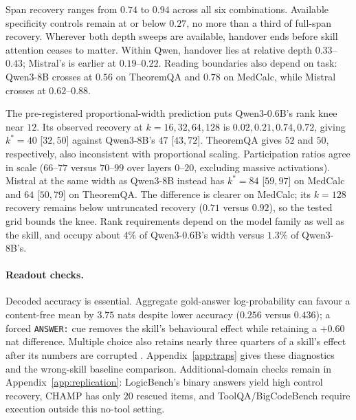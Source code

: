 \documentclass{article}
\begin{document}
\begin{table}[t]
\caption{Replication after the instrument fix. Injection layers are $8$ for
Qwen3-8B, $6$ for Qwen3-0.6B and $4$ for Mistral-7B. Recovery intervals bootstrap
skill groups. Max control is the largest available half-dose, other-skill,
permutation or noise result. Handover brackets the relative depth where
$\rho$ crosses below $0.5$; reading is the first knockout depth retaining at
least half of rescued items. $k^{*}$ is the grid-defined rank knee.
``--'' denotes a measurement not run after the fix.}
\label{tab:replication}
\centering
\footnotesize
\setlength{\tabcolsep}{4pt}

\end{table}

Span recovery ranges from $0.74$ to $0.94$ across all six combinations.
Available specificity controls remain at or below $0.27$, no more than a third
of full-span recovery. Wherever both depth sweeps are available, handover ends
before skill attention ceases to matter. Within Qwen, handover lies at relative
depth $0.33$--$0.43$; Mistral's is earlier at $0.19$--$0.22$. Reading boundaries
also depend on task: Qwen3-8B crosses at $0.56$ on TheoremQA and $0.78$ on
MedCalc, while Mistral crosses at $0.62$--$0.88$.

The pre-registered proportional-width prediction puts Qwen3-0.6B's rank knee
near $12$. Its observed recovery at $k=16,32,64,128$ is
$0.02,0.21,0.74,0.72$, giving $k^{*}=40$ [$32,50$] against Qwen3-8B's $47$
[$43,72$]. TheoremQA gives $52$ and $50$, respectively, also inconsistent with
proportional scaling. Participation ratios agree in scale ($66$--$77$ versus
$70$--$99$ over layers $0$--$20$, excluding massive activations). Mistral at the
same width as Qwen3-8B instead has $k^{*}=84$ [$59,97$] on MedCalc and $64$
[$50,79$] on TheoremQA. The difference is clearer on MedCalc; its $k=128$
recovery remains below untruncated recovery ($0.71$ versus $0.92$), so the tested
grid bounds the knee. Rank requirements depend on the model family as well as
the skill, and occupy about $4\%$ of Qwen3-0.6B's width versus $1.3\%$ of
Qwen3-8B's.

\paragraph{Readout checks.}
\label{sec:traps}
Decoded accuracy is essential. Aggregate gold-answer log-probability can favour
a content-free mean by $3.75$ nats despite lower accuracy ($0.256$ versus
$0.436$); a forced \texttt{ANSWER:} cue removes the skill's behavioural effect
while retaining a $+0.60$ nat difference. Multiple choice also retains nearly
three quarters of a skill's effect after its numbers are corrupted
\citep{balepur2024artifacts}. Appendix~\ref{app:traps} gives these diagnostics and
the wrong-skill baseline comparison. Additional-domain checks remain in
Appendix~\ref{app:replication}: LogicBench's binary answers yield high control
recovery, CHAMP has only $20$ rescued items, and ToolQA/BigCodeBench require
execution outside this no-tool setting.
\end{document}
